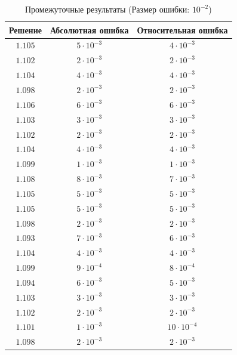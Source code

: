 \begin{table}[h]
   \centering
   \caption{Промежуточные результаты (Размер ошибки: $10^{-2}$)}
   \begin{tabular}{|c|c|c|}
       \hline
       Решение & Абсолютная ошибка & Относительная ошибка \\
       \hline
       $1.105$ & $5 \cdot 10^{-3}$ & $4 \cdot 10^{-3}$ \\
       \hline
       $1.102$ & $2 \cdot 10^{-3}$ & $2 \cdot 10^{-3}$ \\
       \hline
       $1.104$ & $4 \cdot 10^{-3}$ & $4 \cdot 10^{-3}$ \\
       \hline
       $1.098$ & $2 \cdot 10^{-3}$ & $2 \cdot 10^{-3}$ \\
       \hline
       $1.106$ & $6 \cdot 10^{-3}$ & $6 \cdot 10^{-3}$ \\
       \hline
       $1.103$ & $3 \cdot 10^{-3}$ & $3 \cdot 10^{-3}$ \\
       \hline
       $1.102$ & $2 \cdot 10^{-3}$ & $2 \cdot 10^{-3}$ \\
       \hline
       $1.104$ & $4 \cdot 10^{-3}$ & $4 \cdot 10^{-3}$ \\
       \hline
       $1.099$ & $1 \cdot 10^{-3}$ & $1 \cdot 10^{-3}$ \\
       \hline
       $1.108$ & $8 \cdot 10^{-3}$ & $7 \cdot 10^{-3}$ \\
       \hline
       $1.105$ & $5 \cdot 10^{-3}$ & $5 \cdot 10^{-3}$ \\
       \hline
       $1.105$ & $5 \cdot 10^{-3}$ & $5 \cdot 10^{-3}$ \\
       \hline
       $1.098$ & $2 \cdot 10^{-3}$ & $2 \cdot 10^{-3}$ \\
       \hline
       $1.093$ & $7 \cdot 10^{-3}$ & $6 \cdot 10^{-3}$ \\
       \hline
       $1.104$ & $4 \cdot 10^{-3}$ & $4 \cdot 10^{-3}$ \\
       \hline
       $1.099$ & $9 \cdot 10^{-4}$ & $8 \cdot 10^{-4}$ \\
       \hline
       $1.094$ & $6 \cdot 10^{-3}$ & $5 \cdot 10^{-3}$ \\
       \hline
       $1.103$ & $3 \cdot 10^{-3}$ & $3 \cdot 10^{-3}$ \\
       \hline
       $1.102$ & $2 \cdot 10^{-3}$ & $2 \cdot 10^{-3}$ \\
       \hline
       $1.101$ & $1 \cdot 10^{-3}$ & $10 \cdot 10^{-4}$ \\
       \hline
       $1.098$ & $2 \cdot 10^{-3}$ & $2 \cdot 10^{-3}$ \\

\end{tabular}
\end{table}
